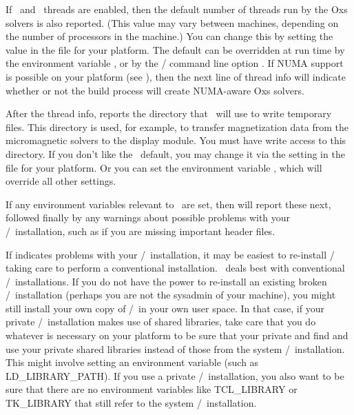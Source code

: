 If \Tcl\ and \OOMMF\ threads are enabled, then 
the default number of threads run by the Oxs solvers is also
reported.  (This value may
vary between machines, depending on the number of processors in the
machine.)  You can change this by setting the
 value in
the  file for your platform.  The default can be
overridden at run time by the environment variable
, or by
the / command line option .  If
NUMA support is possible on your platform (see
),
then the next line of thread info will indicate whether or not the build
process will create NUMA-aware Oxs solvers.

After the thread info,  reports the directory
that \OOMMF\ will use to write temporary files.
This directory is used, for example, to transfer magnetization data from
the micromagnetic solvers to the  display module.  You must
have write access to this directory.  If you don't like the
\OOMMF\ default, you may change it via the
setting in the  file for your platform.  Or you
can set the environment variable
, which will
override all other settings.

If any environment variables relevant to \OOMMF\ are set, then
 will report these next, followed finally by any
warnings about possible problems with your \Tcl/\Tk\ installation, such
as if you are missing important header files.

If  indicates problems with your \Tcl/\Tk\
installation,
it may be easiest to re-install \Tcl/\Tk\, taking care to perform a
conventional installation.  \OOMMF\ deals best with conventional
\Tcl/\Tk\ installations.  If you do not have the power to re-install
an existing broken \Tcl/\Tk\ installation (perhaps you are not
the sysadmin of your machine), you might still install your own
copy of \Tcl/\Tk\ in your own user space.  In that case, if your
private \Tcl/\Tk\ installation makes use of shared libraries,
take care that you do whatever is necessary on your platform to
be sure that your private  and  
find and use your private
shared libraries instead of those from the system \Tcl/\Tk\ installation.
This might involve setting an environment variable (such as 
LD\_LIBRARY\_PATH).
If you use a private \Tcl/\Tk\ installation, you also want to be sure
that there are no environment variables like 
TCL\_LIBRARY
or TK\_LIBRARY
that still refer to the system \Tcl/\Tk\ installation.

